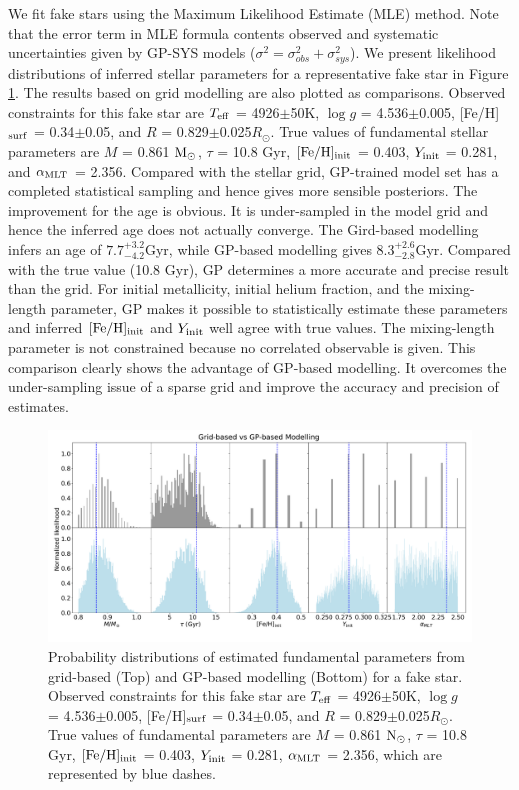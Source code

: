 We fit fake stars using the Maximum Likelihood Estimate (MLE) method. Note that the error term in MLE formula contents observed and systematic uncertainties given by GP-SYS models ($\sigma^{2} = \sigma_{obs}^{2} +  \sigma_{sys}^{2} $).
%
We present likelihood distributions of inferred stellar parameters for a representative fake star in Figure \ref{fig:fit_comparison}. The results based on grid modelling are also plotted as comparisons. 
%
Observed constraints for this fake star are $T_{\rm eff}$ = 4926$\pm$50K, $\log g$ = 4.536$\pm$0.005, [Fe/H]$_{\rm surf}$ =  0.34$\pm$0.05, and $R$ =  0.829$\pm$0.025$R_{\odot}$. True values of fundamental stellar parameters are $M$ = 0.861 $\rm M_{\odot}$, $\tau$ = 10.8 Gyr, $\rm [Fe/H]_{init}$ = 0.403, $Y_{\rm init}$ = 0.281, and $\alpha_{\rm MLT}$ = 2.356. 
%
Compared with the stellar grid, GP-trained model set has a completed statistical sampling and hence gives more sensible posteriors. The improvement for the age is obvious. It is under-sampled in the model grid and hence the inferred age does not actually converge. The Gird-based modelling infers an age of $7.7^{+3.2}_{-4.2}$Gyr, while GP-based modelling gives $8.3^{+2.6}_{-2.8}$Gyr. Compared with the true value (10.8 Gyr), GP determines a more accurate and precise result than the grid. For initial metallicity, initial helium fraction, and the mixing-length parameter, GP makes it possible to statistically estimate these parameters and inferred $\rm[Fe/H]_{init}$ and $Y_{\rm init}$ well agree with true values. The mixing-length parameter is not constrained because no correlated observable is given. This comparison clearly shows the advantage of GP-based modelling. It overcomes the under-sampling issue of a sparse grid and improve the accuracy and precision of estimates. 

\begin{figure}
	\includegraphics[width=1.9\columnwidth]{gp_fitting.pdf}
    \caption{Probability distributions of estimated fundamental parameters from grid-based (Top) and GP-based modelling (Bottom) for a fake star. Observed constraints for this fake star are $T_{\rm eff}$ = 4926$\pm$50K, $\log g$ = 4.536$\pm$0.005, [Fe/H]$_{\rm surf}$ =  0.34$\pm$0.05, and $R$ =  0.829$\pm$0.025$R_{\odot}$. True values of fundamental parameters are $M$ = 0.861 $\rm N_{\odot}$, $\tau$ = 10.8 Gyr, $\rm [Fe/H]_{init}$ = 0.403, $Y_{\rm init}$ = 0.281, $\alpha_{\rm MLT}$ = 2.356, which are represented by blue dashes.} 
  \label{fig:fit_comparison}
\end{figure}


